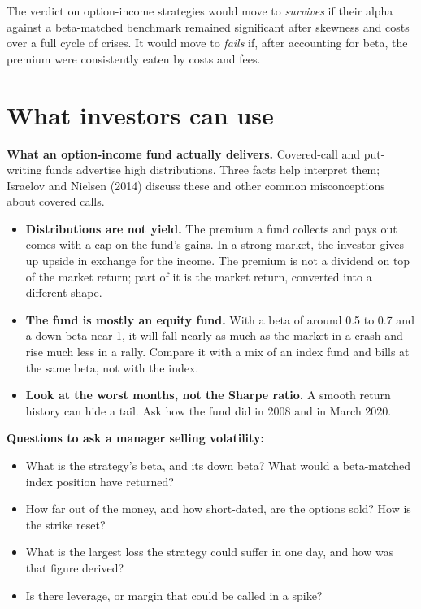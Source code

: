 The verdict on option-income strategies would move to \emph{survives} if their alpha against a beta-matched benchmark remained significant after skewness and costs over a full cycle of crises. It would move to \emph{fails} if, after accounting for beta, the premium were consistently eaten by costs and fees.

\section{What investors can use}
\label{sec:16-investors}

\textbf{What an option-income fund actually delivers.} Covered-call and put-writing funds advertise high distributions. Three facts help interpret them; Israelov and Nielsen (2014) discuss these and other common misconceptions about covered calls.

\begin{itemize}
  \item \textbf{Distributions are not yield.} The premium a fund collects and pays out comes with a cap on the fund's gains. In a strong market, the investor gives up upside in exchange for the income. The premium is not a dividend on top of the market return; part of it is the market return, converted into a different shape.
  \item \textbf{The fund is mostly an equity fund.} With a beta of around 0.5 to 0.7 and a down beta near 1, it will fall nearly as much as the market in a crash and rise much less in a rally. Compare it with a mix of an index fund and bills at the same beta, not with the index.
  \item \textbf{Look at the worst months, not the Sharpe ratio.} A smooth return history can hide a tail. Ask how the fund did in 2008 and in March 2020.
\end{itemize}

\textbf{Questions to ask a manager selling volatility:}

\begin{itemize}
  \item What is the strategy's beta, and its down beta? What would a beta-matched index position have returned?
  \item How far out of the money, and how short-dated, are the options sold? How is the strike reset?
  \item What is the largest loss the strategy could suffer in one day, and how was that figure derived?
  \item Is there leverage, or margin that could be called in a spike?
\end{itemize}

